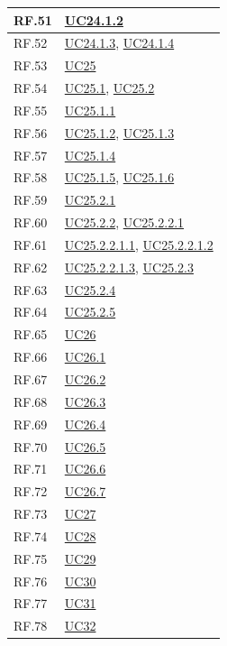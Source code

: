 \documentclass[12pt, a4paper]{article}
\begin{document}
\begin{longtable}{|l|p{}|}
RF.51 & \hyperref[uc:24.1.2]{UC24.1.2} \\ \hline
RF.52 & \hyperref[uc:24.1.3]{UC24.1.3}, \hyperref[uc:24.1.4]{UC24.1.4} \\ \hline
RF.53 & \hyperref[uc:25]{UC25} \\ \hline
RF.54 & \hyperref[uc:25.1]{UC25.1}, \hyperref[uc:25.2]{UC25.2} \\ \hline
RF.55 & \hyperref[uc:25.1.1]{UC25.1.1} \\ \hline
RF.56 & \hyperref[uc:25.1.2]{UC25.1.2}, \hyperref[uc:25.1.3]{UC25.1.3} \\ \hline
RF.57 & \hyperref[uc:25.1.4]{UC25.1.4} \\ \hline
RF.58 & \hyperref[uc:25.1.5]{UC25.1.5}, \hyperref[uc:25.1.6]{UC25.1.6} \\ \hline
RF.59 & \hyperref[uc:25.2.1]{UC25.2.1} \\ \hline
RF.60 & \hyperref[uc:25.2.2]{UC25.2.2}, \hyperref[uc:25.2.2.1]{UC25.2.2.1} \\ \hline
RF.61 & \hyperref[uc:25.2.2.1.1]{UC25.2.2.1.1}, \hyperref[uc:25.2.2.1.2]{UC25.2.2.1.2} \\ \hline
RF.62 & \hyperref[uc:25.2.2.1.3]{UC25.2.2.1.3}, \hyperref[uc:25.2.3]{UC25.2.3} \\ \hline
RF.63 & \hyperref[uc:25.2.4]{UC25.2.4} \\ \hline
RF.64 & \hyperref[uc:25.2.5]{UC25.2.5} \\ \hline
RF.65 & \hyperref[uc:26]{UC26} \\ \hline
RF.66 & \hyperref[uc:26.1]{UC26.1} \\ \hline
RF.67 & \hyperref[uc:26.2]{UC26.2} \\ \hline
RF.68 & \hyperref[uc:26.3]{UC26.3} \\ \hline
RF.69 & \hyperref[uc:26.4]{UC26.4} \\ \hline
RF.70 & \hyperref[uc:26.5]{UC26.5} \\ \hline
RF.71 & \hyperref[uc:26.6]{UC26.6} \\ \hline
RF.72 & \hyperref[uc:26.7]{UC26.7} \\ \hline
RF.73 & \hyperref[uc:27]{UC27} \\ \hline
RF.74 & \hyperref[uc:28]{UC28} \\ \hline
RF.75 & \hyperref[uc:29]{UC29} \\ \hline
RF.76 & \hyperref[uc:30]{UC30} \\ \hline
RF.77 & \hyperref[uc:31]{UC31} \\ \hline
RF.78 & \hyperref[uc:32]{UC32} \\ \hline

\end{longtable}
\end{document}
